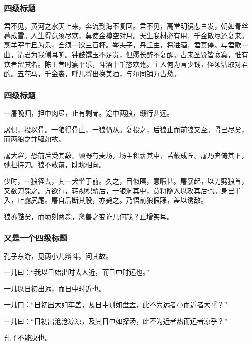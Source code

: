 \documentclass[
    bachelor, 
    pdflinks,
    ]{xjtuthesis}
\begin{document}
                \subsubsection{四级标题}
                    
                君不见，黄河之水天上来，奔流到海不复回。君不见，高堂明镜悲白发，朝如青丝暮成雪。人生得意须尽欢，莫使金樽空对月。天生我材必有用，千金散尽还复来。烹羊宰牛且为乐，会须一饮三百杯。岑夫子，丹丘生，将进酒，君莫停。与君歌一曲，请君为我侧耳听。钟鼓馔玉不足贵，但愿长醉不复醒。古来圣贤皆寂寞，惟有饮者留其名。陈王昔时宴平乐，斗酒十千恣欢谑。主人何为言少钱，径须沽取对君酌。五花马，千金裘，呼儿将出换美酒，与尔同销万古愁。

                \subsubsection{四级标题}

                    一屠晚归，担中肉尽，止有剩骨。途中两狼，缀行甚远。

                    屠惧，投以骨。一狼得骨止，一狼仍从。复投之，后狼止而前狼又至。骨已尽矣，而两狼之并驱如故。

                    屠大窘，恐前后受其敌。顾野有麦场，场主积薪其中，苫蔽成丘。屠乃奔倚其下，弛担持刀。狼不敢前，眈眈相向。

                    少时，一狼径去，其一犬坐于前。久之，目似瞑，意暇甚。屠暴起，以刀劈狼首，又数刀毙之。方欲行，转视积薪后，一狼洞其中，意将隧入以攻其后也。身已半入，止露尻尾。屠自后断其股，亦毙之。乃悟前狼假寐，盖以诱敌。

                    狼亦黠矣，而顷刻两毙，禽兽之变诈几何哉？止增笑耳。

                \subsubsection{又是一个四级标题}

                    孔子东游，见两小儿辩斗。问其故。

                    一儿曰：“我以日始出时去人近，而日中时远也。”

                    一儿以日初出远，而日中时近也。

                    一儿曰：“日初出大如车盖，及日中则如盘盂，此不为远者小而近者大乎？”

                    一儿曰：“日初出沧沧凉凉，及其日中如探汤，此不为近者热而远者凉乎？”

                    孔子不能决也。
\end{document}
